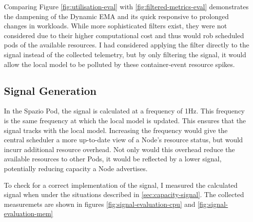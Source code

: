 Comparing Figure \ref{fig:utilisation-eval} with \ref{fig:filtered-metrics-eval}
demonstrates the dampening of the Dynamic EMA and its quick responsive to
prolonged changes in workloads. While more sophisticated filters exist, they
were not considered due to their higher computational cost and thus would rob
scheduled pods of the available resources. I had considered applying the filter
directly to the signal instead of the collected telemetry, but by only filtering
the signal, it would allow the local model to be polluted by these
container-event resource spikes.

\subsection{Signal Generation}
In the Spazio Pod, the signal is calculated at a frequency of 1Hz. This
frequency is the same frequency at which the local model is updated. This
ensures that the signal tracks with the local model. Increasing the frequency
would give the central scheduler a more up-to-date view of a Node's resource
status, but would incurr additional resource overhead. Not only would this
overhead reduce the available resources to other Pods, it would be reflected by
a lower signal, potentially reducing capacity a Node advertises.

To check for a correct implementation of the signal, I measured the calculated
signal when under the situations described in \ref{sec:capacity-signal}. The
collected measuremets are shown in figures \ref{fig:signal-evaluation-cpu} and
\ref{fig:signal-evaluation-mem}

